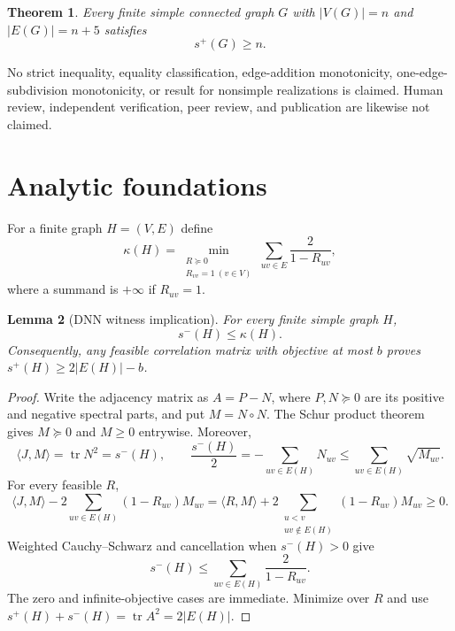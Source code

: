 \documentclass[11pt]{article}
\newtheorem{theorem}{Theorem}[section]
\newtheorem{lemma}[theorem]{Lemma}
\theoremstyle{definition}
\theoremstyle{remark}
\newcommand{\spn}{s^+}
\newcommand{\smn}{s^-}
\begin{document}
\begin{theorem}\label{thm:main}
Every finite simple connected graph $G$ with $|V(G)|=n$ and
$|E(G)|=n+5$ satisfies
\[
 \boxed{\spn(G)\ge n}.
\]
\end{theorem}

No strict inequality, equality classification, edge-addition monotonicity,
one-edge-subdivision monotonicity, or result for nonsimple realizations is
claimed.  Human review, independent verification, peer review, and publication
are likewise not claimed.

\section{Analytic foundations}

For a finite graph $H=(V,E)$ define
\begin{equation}\label{eq:kappa}
 \kappa(H)=\min_{\substack{R\succeq0\\R_{vv}=1\ (v\in V)}}
 \sum_{uv\in E}\frac{2}{1-R_{uv}},
\end{equation}
where a summand is $+\infty$ if $R_{uv}=1$.

\begin{lemma}[DNN witness implication]\label{lem:dnn}
For every finite simple graph $H$,
\[
 \smn(H)\le\kappa(H).
\]
Consequently, any feasible correlation matrix with objective at most $b$
proves $\spn(H)\ge2|E(H)|-b$.
\end{lemma}
\begin{proof}
Write the adjacency matrix as $A=P-N$, where $P,N\succeq0$ are its positive
and negative spectral parts, and put $M=N\circ N$.  The Schur product theorem
gives $M\succeq0$ and $M\ge0$ entrywise.  Moreover,
\[
 \langle J,M\rangle=\operatorname{tr}N^2=\smn(H),
 \qquad
 \frac{\smn(H)}2=-\sum_{uv\in E(H)}N_{uv}
 \le\sum_{uv\in E(H)}\sqrt{M_{uv}}.
\]
For every feasible $R$,
\[
 \langle J,M\rangle-2\sum_{uv\in E(H)}(1-R_{uv})M_{uv}
 =\langle R,M\rangle+
 2\sum_{\substack{u<v\\uv\notin E(H)}}(1-R_{uv})M_{uv}\ge0.
\]
Weighted Cauchy--Schwarz and cancellation when $\smn(H)>0$ give
\[
 \smn(H)\le\sum_{uv\in E(H)}\frac{2}{1-R_{uv}}.
\]
The zero and infinite-objective cases are immediate.  Minimize over $R$ and
use $\spn(H)+\smn(H)=\operatorname{tr}A^2=2|E(H)|$.
\end{proof}
\end{document}
